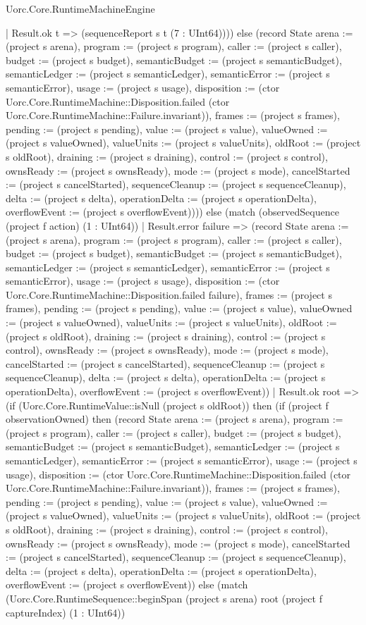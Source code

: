 \begin{lexlean}{Uorc.Core.RuntimeMachineEngine}
\begin{semanticmodule}
{          | Result.ok t => (sequenceReport s t (7 : UInt64)))) else (record State {arena := (project s arena), program := (project s program), caller := (project s caller), budget := (project s budget), semanticBudget := (project s semanticBudget), semanticLedger := (project s semanticLedger), semanticError := (project s semanticError), usage := (project s usage), disposition := (ctor Uorc.Core.RuntimeMachine::Disposition.failed (ctor Uorc.Core.RuntimeMachine::Failure.invariant)), frames := (project s frames), pending := (project s pending), value := (project s value), valueOwned := (project s valueOwned), valueUnits := (project s valueUnits), oldRoot := (project s oldRoot), draining := (project s draining), control := (project s control), ownsReady := (project s ownsReady), mode := (project s mode), cancelStarted := (project s cancelStarted), sequenceCleanup := (project s sequenceCleanup), delta := (project s delta), operationDelta := (project s operationDelta), overflowEvent := (project s overflowEvent)}))) else (match (observedSequence (project f action) (1 : UInt64))
        | Result.error failure => (record State {arena := (project s arena), program := (project s program), caller := (project s caller), budget := (project s budget), semanticBudget := (project s semanticBudget), semanticLedger := (project s semanticLedger), semanticError := (project s semanticError), usage := (project s usage), disposition := (ctor Uorc.Core.RuntimeMachine::Disposition.failed failure), frames := (project s frames), pending := (project s pending), value := (project s value), valueOwned := (project s valueOwned), valueUnits := (project s valueUnits), oldRoot := (project s oldRoot), draining := (project s draining), control := (project s control), ownsReady := (project s ownsReady), mode := (project s mode), cancelStarted := (project s cancelStarted), sequenceCleanup := (project s sequenceCleanup), delta := (project s delta), operationDelta := (project s operationDelta), overflowEvent := (project s overflowEvent)})
        | Result.ok root => (if (Uorc.Core.RuntimeValue::isNull (project s oldRoot)) then (if (project f observationOwned) then (record State {arena := (project s arena), program := (project s program), caller := (project s caller), budget := (project s budget), semanticBudget := (project s semanticBudget), semanticLedger := (project s semanticLedger), semanticError := (project s semanticError), usage := (project s usage), disposition := (ctor Uorc.Core.RuntimeMachine::Disposition.failed (ctor Uorc.Core.RuntimeMachine::Failure.invariant)), frames := (project s frames), pending := (project s pending), value := (project s value), valueOwned := (project s valueOwned), valueUnits := (project s valueUnits), oldRoot := (project s oldRoot), draining := (project s draining), control := (project s control), ownsReady := (project s ownsReady), mode := (project s mode), cancelStarted := (project s cancelStarted), sequenceCleanup := (project s sequenceCleanup), delta := (project s delta), operationDelta := (project s operationDelta), overflowEvent := (project s overflowEvent)}) else (match (Uorc.Core.RuntimeSequence::beginSpan (project s arena) root (project f captureIndex) (1 : UInt64))
}
\end{semanticmodule}
\end{lexlean}
